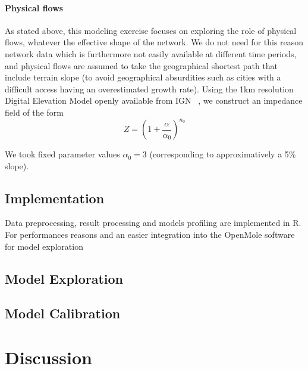 \paragraph{Physical flows}

As stated above, this modeling exercise focuses on exploring the role of physical flows, whatever the effective shape of the network. We do not need for this reason network data which is furthermore not easily available at different time periods, and physical flows are assumed to take the geographical shortest path that include terrain slope (to avoid geographical absurdities such as cities with a difficult access having an overestimated growth rate). Using the 1km resolution Digital Elevation Model openly available from IGN~\cite{}%
, we construct an impedance field of the form
\[
Z = \left(1 + \frac{\alpha}{\alpha_0}\right)^{n_0}
\]

We took fixed parameter values $\alpha_0 = 3$ (corresponding to approximatively a 5\% slope).


\subsection{Implementation}

Data preprocessing, result processing and models profiling are implemented in R. For performances reasons and an easier integration into the OpenMole software for model exploration~\cite{reuillon2013openmole}



\subsection{Model Exploration}



\subsection{Model Calibration}




\section{Discussion}







